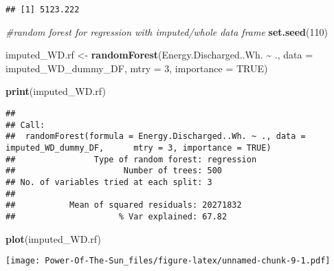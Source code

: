 \documentclass[
]{article}
\newenvironment{Shaded}{\begin{snugshade}}{\end{snugshade}}
\newcommand{\AttributeTok}[1]{\textcolor[rgb]{0.13,0.29,0.53}{#1}}
\newcommand{\CommentTok}[1]{\textcolor[rgb]{0.56,0.35,0.01}{\textit{#1}}}
\newcommand{\ConstantTok}[1]{\textcolor[rgb]{0.56,0.35,0.01}{#1}}
\newcommand{\DecValTok}[1]{\textcolor[rgb]{0.00,0.00,0.81}{#1}}
\newcommand{\FunctionTok}[1]{\textcolor[rgb]{0.13,0.29,0.53}{\textbf{#1}}}
\newcommand{\NormalTok}[1]{#1}
\newcommand{\OtherTok}[1]{\textcolor[rgb]{0.56,0.35,0.01}{#1}}
\newcommand{\SpecialCharTok}[1]{\textcolor[rgb]{0.81,0.36,0.00}{\textbf{#1}}}
\begin{document}
\begin{Shaded}
\end{Shaded}

\begin{verbatim}
## [1] 5123.222
\end{verbatim}

\begin{Shaded}
\begin{Highlighting}[]
\CommentTok{\#random forest for regression with imputed/whole data frame  }
\FunctionTok{set.seed}\NormalTok{(}\DecValTok{110}\NormalTok{)}

\NormalTok{imputed\_WD.rf }\OtherTok{\textless{}{-}} \FunctionTok{randomForest}\NormalTok{(Energy.Discharged..Wh. }\SpecialCharTok{\textasciitilde{}}\NormalTok{ ., }
                         \AttributeTok{data =}\NormalTok{ imputed\_WD\_dummy\_DF, }
                         \AttributeTok{mtry =} \DecValTok{3}\NormalTok{, }
                         \AttributeTok{importance =} \ConstantTok{TRUE}\NormalTok{) }

\FunctionTok{print}\NormalTok{(imputed\_WD.rf)}
\end{Highlighting}
\end{Shaded}

\begin{verbatim}
## 
## Call:
##  randomForest(formula = Energy.Discharged..Wh. ~ ., data = imputed_WD_dummy_DF,      mtry = 3, importance = TRUE) 
##                Type of random forest: regression
##                      Number of trees: 500
## No. of variables tried at each split: 3
## 
##           Mean of squared residuals: 20271832
##                     % Var explained: 67.82
\end{verbatim}

\begin{Shaded}
\begin{Highlighting}[]
\FunctionTok{plot}\NormalTok{(imputed\_WD.rf)}
\end{Highlighting}
\end{Shaded}

\texttt{[image: Power-Of-The-Sun\_files/figure-latex/unnamed-chunk-9-1.pdf]}

\begin{Shaded}
\end{Shaded}
\end{document}
